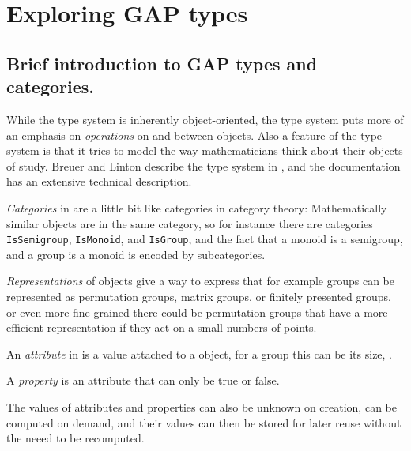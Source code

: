 \section{Exploring GAP types}

\subsection{Brief introduction to GAP types and categories.}\label{gap-types-intro}


While the \Sage type system is inherently object-oriented, the \GAP type
system puts more of an emphasis on \emph{operations} on and between objects.
Also a feature of the \GAP type system is that it tries to model the way
mathematicians think about their objects of study. Breuer and Linton describe
the \GAP type system in \cite{breuer-linton}, and the \GAP documentation
\cite{GAP4} has an extensive technical description.

\emph{Categories} in \GAP are a little bit like categories in category theory:
Mathematically similar objects are in the same category, so for instance
there are categories \texttt{IsSemigroup}, \texttt{IsMonoid}, and
\texttt{IsGroup}, and the fact that a monoid is a semigroup, and
a group is a monoid is encoded by subcategories. 

\emph{Representations} of objects give a way to express that for example
groups can be represented as permutation groups, matrix groups, or finitely
presented groups, or even more fine-grained there could be permutation groups
that have a more efficient representation if they act on a small numbers of
points.

An \emph{attribute} in \GAP is a value attached to a \GAP object, for
a group this can be its size,
.

A \emph{property} is an attribute that can only be true or false.

The values of attributes and properties can also be unknown on creation,
can be computed on demand, and their values can then be stored for later
reuse without the neeed to be recomputed.


